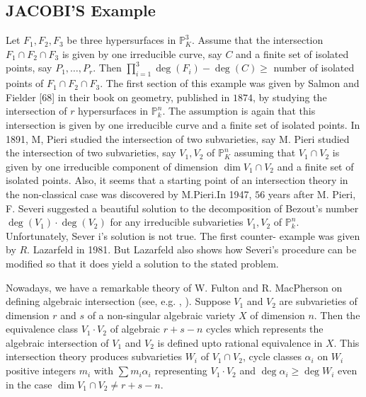 \setcounter{subsection}{11}
\subsection{JACOBI'S Example}\label{chap:sec2:subsec0.11}

Let $F_1,F_2,F_3$ be three hypersurfaces in $ \mathbb{P}^3_K$. Assume
that the intersection $F_1\cap F_2\cap F_3$ is given by one
irreducible curve, say $C$ and a finite set of isolated points, say
$P_1,\ldots, P_r$. Then $\prod\limits^3_{i=1} \deg (F_i)- \deg (C)
\geq $ number of isolated points of $F_1\cap F_2\cap F_3$. The first
section of this example was given by Salmon and Fielder [68] in
their book on geometry, published in $1874$, by studying the
intersection of $r$ hypersurfaces in $ \mathbb{P}^n_k$. The assumption
is again that this intersection is given by one irreducible curve and
a finite set of isolated points. In 1891, M, Pieri \cite{59} studied
the intersection of two subvarieties, say M. Pieri \cite{59} studied the
intersection of two subvarieties, say $V_1,V_2$ of $ \mathbb{P}^n_K$
assuming that $V_1\cap V_2$ is given by one irreducible component of
dimension $\dim V_1\cap V_2$ and a finite set of isolated points. Also,
it seems that a starting point of an intersection theory in the
non-classical case was discovered by M.Pieri.\pageoriginale In 1947, $56$ years
after M. Pieri, F. Severi \cite{78} suggested a beautiful solution to the
decomposition of Bezout's number $\deg(V_1)\cdot \deg (V_2)$ for any
irreducible subvarieties $V_1,V_2$ of $\mathbb{P}^n_k$. Unfortunately,
Sever i's solution is not true. The first counter- example was given by
$R$. Lazarfeld \cite{45} in 1981. But Lazarfeld also shows how Severi's
procedure can be modified so that it does yield a solution to the
stated problem.

Nowadays, we have a remarkable theory of W. Fulton and R. Mac\-Pherson on
defining algebraic intersection (see, e.g. \cite{18}, \cite{19}). Suppose
$V_1$ and $V_2$ are subvarieties of dimension $r$ and $s$ of a
non-singular algebraic variety $X$ of dimension $n$. Then the
equivalence class $V_1\cdot V_2$ of algebraic $r+s-n$ cycles which
represents the algebraic intersection of $V_1$ and $V_2$ is defined
upto rational equivalence in $X$. This intersection theory produces
subvarieties $W_i$ of $V_1\cap V_2$, cycle classes $\alpha_i$ on $W_i$
positive integers $m_i$ with $\sum m_i \alpha_i $ representing
$V_1\cdot V_2$ and $\deg \alpha_i \ge\deg W_i$ even in the case $\dim
V_1\cap V_2 \neq r+s-n$.

